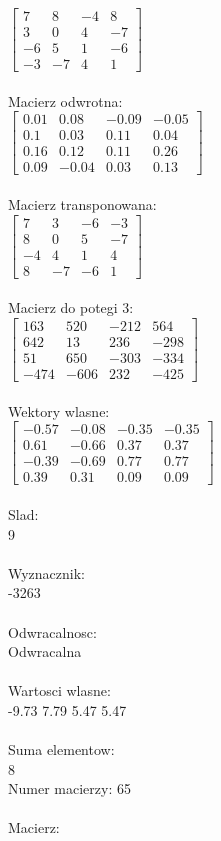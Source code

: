 \documentclass[a4paper,12pt]{article}
\begin{document}
$\begin{bmatrix} 7&8&-4&8\\3&0&4&-7\\-6&5&1&-6\\-3&-7&4&1 \end{bmatrix}$
\\
\\
Macierz odwrotna:\\

$\begin{bmatrix} 0.01&0.08&-0.09&-0.05\\0.1&0.03&0.11&0.04\\0.16&0.12&0.11&0.26\\0.09&-0.04&0.03&0.13 \end{bmatrix}$
\\
\\
Macierz transponowana:\\

$\begin{bmatrix} 7&3&-6&-3\\8&0&5&-7\\-4&4&1&4\\8&-7&-6&1 \end{bmatrix}$
\\
\\
Macierz do potegi 3:\\

$\begin{bmatrix} 163&520&-212&564\\642&13&236&-298\\51&650&-303&-334\\-474&-606&232&-425 \end{bmatrix}$
\\
\\
Wektory wlasne:\\

$\begin{bmatrix} -0.57&-0.08&-0.35&-0.35\\0.61&-0.66&0.37&0.37\\-0.39&-0.69&0.77&0.77\\0.39&0.31&0.09&0.09 \end{bmatrix}$
\\
\\
Slad:\\
9
\\
\\
Wyznacznik:\\
-3263
\\
\\
Odwracalnosc:\\
Odwracalna
\\
\\
Wartosci wlasne:\\
-9.73 7.79 5.47 5.47
\\
\\
Suma elementow:\\
8
\\
\newpage
Numer macierzy:
65
\\
\\
Macierz:\\
\end{document}
